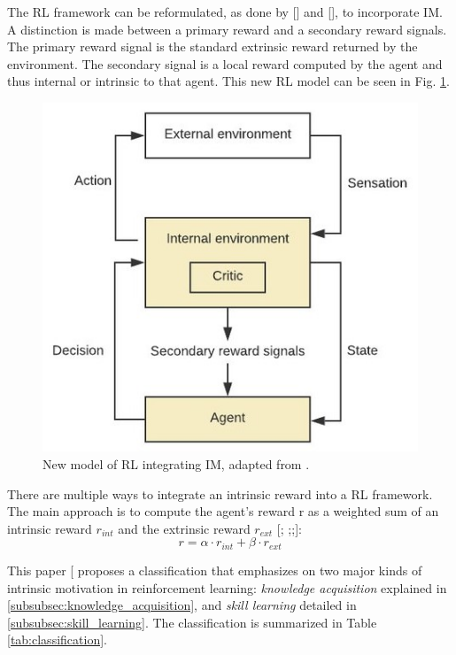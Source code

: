 \documentclass[conference]{IEEEtran}
\begin{document}
The RL framework can be reformulated, as done by [\cite{singh2010intrinsically}] and [\cite{barto2004intrinsically}], to incorporate IM. A distinction is made between a primary reward and a secondary reward signals. The primary reward signal is the standard extrinsic reward returned by the environment. The secondary signal is a local reward computed by the agent and thus internal or intrinsic to that agent. This new RL model can be seen in  Fig. \ref{fig:new_rl_model}.
\begin{figure}[h]
\centering
\includegraphics[width=0.9\columnwidth]{img/New-model-of-RL-integrating-IM-adapted-from-Singh-et-al-2010_W640.jpg}
\caption{New model of RL integrating IM, adapted from \cite{singh2010intrinsically}.}
\label{fig:new_rl_model}
\end{figure}

There are multiple ways to integrate an intrinsic reward into a RL framework. The main approach is to compute the agent’s reward r as a weighted sum
of an intrinsic reward $r_{int}$ and the extrinsic reward $r_{ext}$ [\cite{burda2018exploration}; \cite{gregor2016variational};\cite{vezhnevets2017feudal};\cite{huang2019learning}]:
\begin{equation*}
r = \alpha \cdot r_{int} + \beta \cdot r_{ext}
\end{equation*}

This paper [\cite{aubret2019survey} proposes a classification that emphasizes on two major kinds of intrinsic motivation in reinforcement learning: \textit{knowledge acquisition} explained in \ref{subsubsec:knowledge_acquisition}, and \textit{skill learning} detailed in \ref{subsubsec:skill_learning}. The classification is summarized in Table \ref{tab:classification}.
\end{document}
